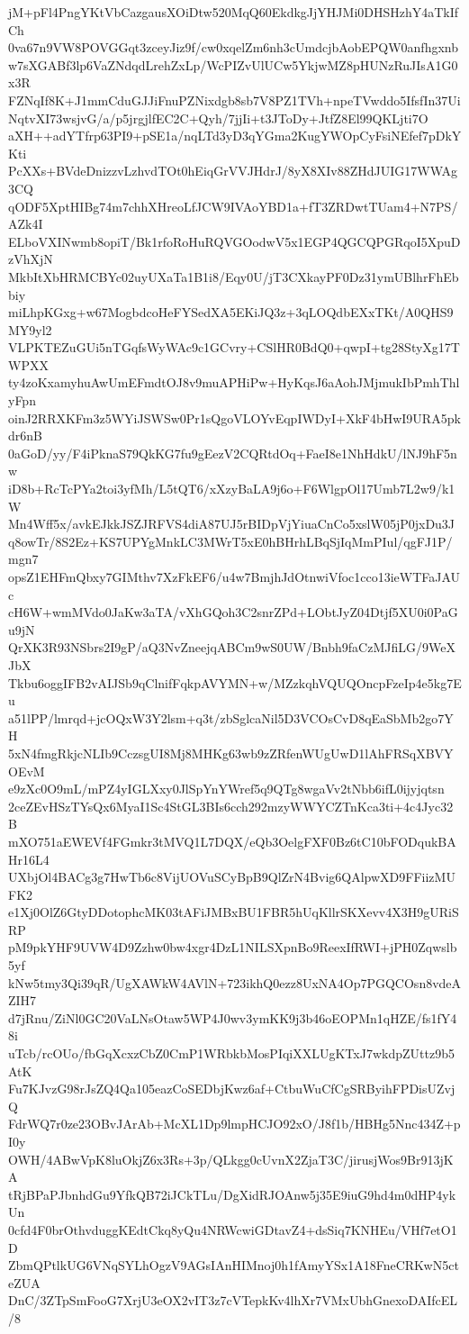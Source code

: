 jM+pFl4PngYKtVbCazgausXOiDtw520MqQ60EkdkgJjYHJMi0DHSHzhY4aTkIfCh
0va67n9VW8POVGGqt3zceyJiz9f/cw0xqelZm6nh3cUmdcjbAobEPQW0anfhgxnb
w7sXGABf3lp6VaZNdqdLrehZxLp/WcPIZvUlUCw5YkjwMZ8pHUNzRuJIsA1G0x3R
FZNqIf8K+J1mmCduGJJiFnuPZNixdgb8sb7V8PZ1TVh+npeTVwddo5IfsfIn37Ui
NqtvXI73wsjvG/a/p5jrgjlfEC2C+Qyh/7jjIi+t3JToDy+JtfZ8El99QKLjti7O
aXH++adYTfrp63PI9+pSE1a/nqLTd3yD3qYGma2KugYWOpCyFsiNEfef7pDkYKti
PcXXs+BVdeDnizzvLzhvdTOt0hEiqGrVVJHdrJ/8yX8XIv88ZHdJUIG17WWAg3CQ
qODF5XptHIBg74m7chhXHreoLfJCW9IVAoYBD1a+fT3ZRDwtTUam4+N7PS/AZk4I
ELboVXINwmb8opiT/Bk1rfoRoHuRQVGOodwV5x1EGP4QGCQPGRqoI5XpuDzVhXjN
MkbItXbHRMCBYc02uyUXaTa1B1i8/Eqy0U/jT3CXkayPF0Dz31ymUBlhrFhEbbiy
miLhpKGxg+w67MogbdcoHeFYSedXA5EKiJQ3z+3qLOQdbEXxTKt/A0QHS9MY9yl2
VLPKTEZuGUi5nTGqfsWyWAc9c1GCvry+CSlHR0BdQ0+qwpI+tg28StyXg17TWPXX
ty4zoKxamyhuAwUmEFmdtOJ8v9muAPHiPw+HyKqsJ6aAohJMjmukIbPmhThlyFpn
oinJ2RRXKFm3z5WYiJSWSw0Pr1sQgoVLOYvEqpIWDyI+XkF4bHwI9URA5pkdr6nB
0aGoD/yy/F4iPknaS79QkKG7fu9gEezV2CQRtdOq+FaeI8e1NhHdkU/lNJ9hF5nw
iD8b+RcTcPYa2toi3yfMh/L5tQT6/xXzyBaLA9j6o+F6WlgpOl17Umb7L2w9/k1W
Mn4Wff5x/avkEJkkJSZJRFVS4diA87UJ5rBIDpVjYiuaCnCo5xslW05jP0jxDu3J
q8owTr/8S2Ez+KS7UPYgMnkLC3MWrT5xE0hBHrhLBqSjIqMmPIul/qgFJ1P/mgn7
opsZ1EHFmQbxy7GIMthv7XzFkEF6/u4w7BmjhJdOtnwiVfoc1cco13ieWTFaJAUc
cH6W+wmMVdo0JaKw3aTA/vXhGQoh3C2snrZPd+LObtJyZ04Dtjf5XU0i0PaGu9jN
QrXK3R93NSbrs2I9gP/aQ3NvZneejqABCm9wS0UW/Bnbh9faCzMJfiLG/9WeXJbX
Tkbu6oggIFB2vAIJSb9qClnifFqkpAVYMN+w/MZzkqhVQUQOncpFzeIp4e5kg7Eu
a51lPP/lmrqd+jcOQxW3Y2lsm+q3t/zbSglcaNil5D3VCOsCvD8qEaSbMb2go7YH
5xN4fmgRkjcNLIb9CczsgUI8Mj8MHKg63wb9zZRfenWUgUwD1lAhFRSqXBVYOEvM
e9zXc0O9mL/mPZ4yIGLXxy0JlSpYnYWref5q9QTg8wgaVv2tNbb6ifL0ijyjqtsn
2ceZEvHSzTYsQx6MyaI1Sc4StGL3BIs6cch292mzyWWYCZTnKca3ti+4c4Jyc32B
mXO751aEWEVf4FGmkr3tMVQ1L7DQX/eQb3OelgFXF0Bz6tC10bFODqukBAHr16L4
UXbjOl4BACg3g7HwTb6c8VijUOVuSCyBpB9QlZrN4Bvig6QAlpwXD9FFiizMUFK2
e1Xj0OlZ6GtyDDotophcMK03tAFiJMBxBU1FBR5hUqKllrSKXevv4X3H9gURiSRP
pM9pkYHF9UVW4D9Zzhw0bw4xgr4DzL1NILSXpnBo9ReexIfRWI+jPH0Zqwslb5yf
kNw5tmy3Qi39qR/UgXAWkW4AVlN+723ikhQ0ezz8UxNA4Op7PGQCOsn8vdeAZIH7
d7jRnu/ZiNl0GC20VaLNsOtaw5WP4J0wv3ymKK9j3b46oEOPMn1qHZE/fs1fY48i
uTcb/rcOUo/fbGqXcxzCbZ0CmP1WRbkbMosPIqiXXLUgKTxJ7wkdpZUttz9b5AtK
Fu7KJvzG98rJsZQ4Qa105eazCoSEDbjKwz6af+CtbuWuCfCgSRByihFPDisUZvjQ
FdrWQ7r0ze23OBvJArAb+McXL1Dp9lmpHCJO92xO/J8f1b/HBHg5Nnc434Z+pI0y
OWH/4ABwVpK8luOkjZ6x3Rs+3p/QLkgg0cUvnX2ZjaT3C/jirusjWos9Br913jKA
tRjBPaPJbnhdGu9YfkQB72iJCkTLu/DgXidRJOAnw5j35E9iuG9hd4m0dHP4ykUn
0cfd4F0brOthvduggKEdtCkq8yQu4NRWcwiGDtavZ4+dsSiq7KNHEu/VHf7etO1D
ZbmQPtlkUG6VNqSYLhOgzV9AGsIAnHIMnoj0h1fAmyYSx1A18FneCRKwN5cteZUA
DnC/3ZTpSmFooG7XrjU3eOX2vIT3z7cVTepkKv4lhXr7VMxUbhGnexoDAIfcEL/8
